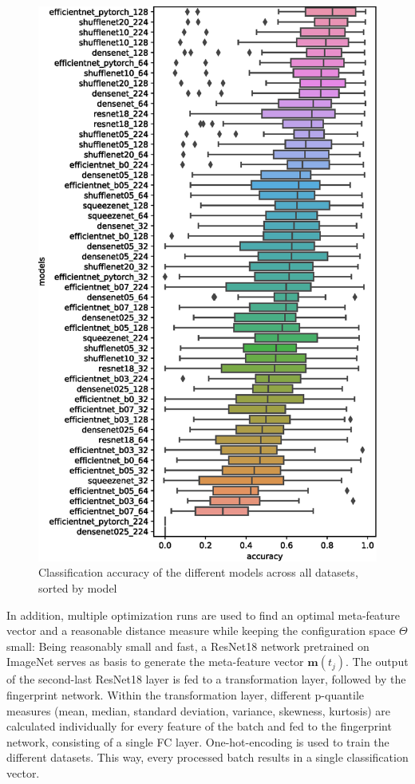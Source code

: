 \documentclass{article}
\begin{document}
%
\begin{figure}[htb]
\begin{center}
 	\includegraphics[width=0.95\linewidth]{../figures/rank_results.eps} 
\end{center}
\caption{Classification accuracy of the different models across all datasets, sorted by model}
\label{fig:rank_results}
\end{figure} 
%

In addition, multiple optimization runs are used to find an optimal meta-feature vector and a reasonable distance measure while keeping the configuration space $\Theta$ small: Being reasonably small and fast, a ResNet18 network pretrained on ImageNet serves as basis to generate the meta-feature vector $\mathbf{m}(t_j)$. 
The output of the second-last ResNet18 layer is fed to a transformation layer, followed by the fingerprint network. 
Within the transformation layer, different p-quantile measures (mean, median, standard deviation, variance, skewness, kurtosis) are calculated individually for every feature of the batch and fed to the fingerprint network, consisting of a single FC layer. One-hot-encoding is used to train the different datasets. This way, every processed batch results in a single classification vector.
\end{document}

